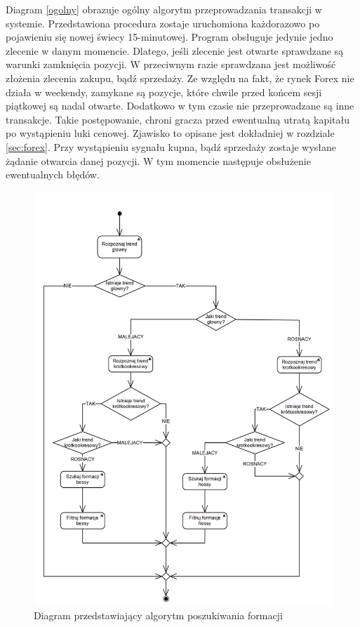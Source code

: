 \documentclass[pdflatex,11pt]{aghdpl}
\begin{document}
Diagram \ref{ogolny} obrazuje ogólny algorytm przeprowadzania transakcji w systemie. Przedstawiona procedura zostaje uruchomiona każdorazowo po pojawieniu się nowej świecy 15-minutowej. Program obsługuje jedynie jedno zlecenie w danym momencie. Dlatego, jeśli zlecenie jest otwarte sprawdzane są warunki zamknięcia pozycji. W przeciwnym razie sprawdzana jest możliwość złożenia zlecenia zakupu, bądź sprzedaży. Ze względu na fakt, że rynek Forex nie działa w weekendy, zamykane są pozycje, które chwile przed końcem sesji piątkowej są nadal otwarte. Dodatkowo w tym czasie nie przeprowadzane są inne transakcje. Takie postępowanie, chroni gracza przed ewentualną utratą kapitału po wystąpieniu luki cenowej. Zjawisko to opisane jest dokładniej w rozdziale \ref{sec:forex}. Przy wystąpieniu sygnału kupna, bądź sprzedaży zostaje wysłane żądanie otwarcia danej pozycji. W tym momencie następuje obsłużenie ewentualnych błędów. 

\begin{figure}[H]
\begin{center}
\includegraphics[width=16cm]{warunki_otwarcia.png}
\caption{Diagram przedstawiający algorytm poszukiwania formacji}
\label{warunki_otwarcia}
\end{center}
\end{figure} 
\end{document}
